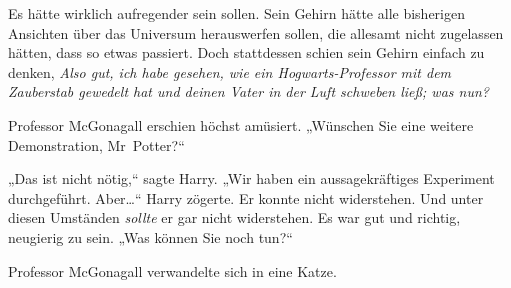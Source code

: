 Es hätte wirklich aufregender sein sollen. Sein Gehirn hätte alle bisherigen Ansichten über das Universum herauswerfen sollen, die allesamt nicht zugelassen hätten, dass so etwas passiert. Doch stattdessen schien sein Gehirn einfach zu denken, \emph{Also gut, ich habe gesehen, wie ein Hogwarts-Professor mit dem Zauberstab gewedelt hat und deinen Vater in der Luft schweben ließ; was nun?}

Professor McGonagall erschien höchst amüsiert. „Wünschen Sie eine weitere Demonstration, Mr~Potter?“

„Das ist nicht nötig,“ sagte Harry. „Wir haben ein aussagekräftiges Experiment durchgeführt. Aber…“ Harry zögerte. Er konnte nicht widerstehen. Und unter diesen Umständen \emph{sollte} er gar nicht widerstehen. Es war gut und richtig, neugierig zu sein. „Was können Sie noch tun?“

Professor McGonagall verwandelte sich in eine Katze.

